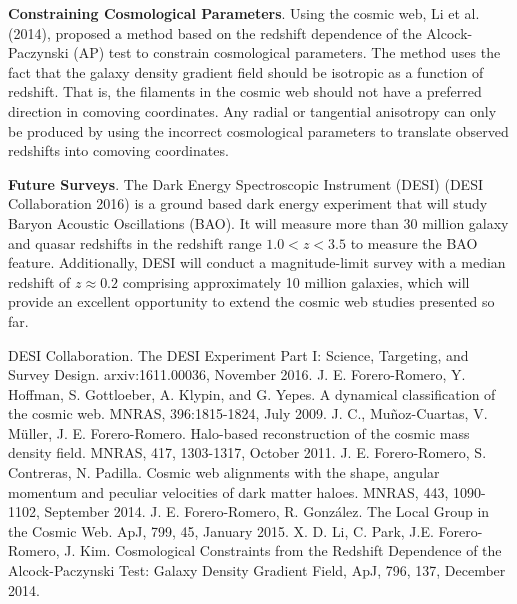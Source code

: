 \documentclass[preprint,proceedings]{rmaa}
\begin{document}
{\bf Constraining Cosmological Parameters}. Using the cosmic web, 
Li et al. (2014), proposed a method based on the redshift dependence of the
Alcock-Paczynski (AP) test to constrain cosmological parameters.
The method uses the fact that the galaxy density gradient field should
be isotropic as a function of redshift. That is, the filaments in
the cosmic web should not have a preferred direction in comoving coordinates. Any radial or
tangential anisotropy can only be produced by using the incorrect
cosmological parameters to translate observed redshifts into
comoving coordinates.


{\bf Future Surveys}. The Dark Energy Spectroscopic Instrument (DESI) (DESI Collaboration
2016) is a ground based dark
energy experiment that will study Baryon Acoustic Oscillations (BAO). 
It will measure more than 30 million galaxy and quasar redshifts in
the redshift range $1.0<z<3.5$ to measure the BAO feature.
Additionally, DESI will conduct a magnitude-limit survey with a median
redshift of $z\approx 0.2$ comprising approximately 10 million galaxies, which
will provide an excellent opportunity to extend the cosmic web
studies presented so far.



\begin{thebibliography}

 DESI Collaboration. The DESI Experiment Part I:
  Science, Targeting, and Survey Design. arxiv:1611.00036, November 2016.  
  J. E. Forero-Romero, Y. Hoffman, S. Gottloeber, A. Klypin,
  and G. Yepes. A dynamical classification of the cosmic web. MNRAS,
  396:1815-1824, July 2009. 
 J. C., {Mu{\~n}oz-Cuartas}, V. {M{\"u}ller},
  J. E. {Forero-Romero}. Halo-based reconstruction of the cosmic mass
  density field. MNRAS, 417, 1303-1317, October 2011.
 J. E. {Forero-Romero}, S. {Contreras}, N. {Padilla}.
  {Cosmic web alignments with the shape, angular momentum
  and peculiar velocities of dark matter haloes}. MNRAS, 443,
  1090-1102, September 2014.
 J. E. {Forero-Romero}, R. {Gonz{\'a}lez}. {The Local Group
  in the Cosmic Web}. ApJ, 799, 45, January 2015.
 X. D. {Li}, C. {Park}, J.E. {Forero-Romero}, J. {Kim}.
  {Cosmological Constraints from the Redshift Dependence of
  the Alcock-Paczynski Test: Galaxy Density Gradient Field},
  ApJ, 796, 137, December 2014. 
\end{thebibliography} 
\end{document}
